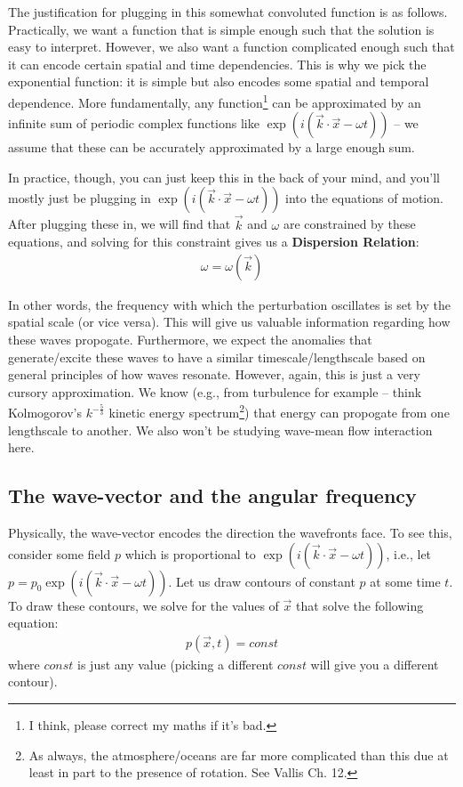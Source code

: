 The justification for plugging in this somewhat convoluted function is as follows. Practically, we want a function that is simple enough such that the solution is easy to interpret. However, we also want a function complicated enough such that it can encode certain spatial and time dependencies. This is why we pick the exponential function: it is simple but also encodes some spatial and temporal dependence. More fundamentally, any function\footnote{I think, please correct my maths if it's bad.} can be approximated by an infinite sum of periodic complex functions like \(\exp(i(\vec{k}\cdot\vec{x}-\omega t))\) -- we assume that these can be accurately approximated by a large enough sum.

In practice, though, you can just keep this in the back of your mind, and you'll mostly just be plugging in \(\exp(i(\vec{k}\cdot\vec{x}-\omega t))\) into the equations of motion. After plugging these in, we will find that \(\vec{k}\) and \(\omega\) are constrained by these equations, and solving for this constraint gives us a \textbf{Dispersion Relation}:
\begin{align*}
    \omega=\omega(\vec{k})
\end{align*} 

In other words, the frequency with which the perturbation oscillates is set by the spatial scale (or vice versa). This will give us valuable information regarding how these waves propogate. Furthermore, we expect the anomalies that generate/excite these waves to have a similar timescale/lengthscale based on general principles of how waves resonate. However, again, this is just a very cursory approximation. We know (e.g., from turbulence for example – think Kolmogorov's \(k^{-\frac{5}{3}}\) kinetic energy spectrum\footnote{As always, the atmosphere/oceans are far more complicated than this due at least in part to the presence of rotation. See Vallis \cite{Vallis} Ch. 12.}) that energy can propogate from one lengthscale to another. We also won't be studying wave-mean flow interaction here.

\subsection{The wave-vector and the angular frequency}

Physically, the wave-vector encodes the direction the wavefronts face. To see this, consider some field \(p\) which is proportional to \(\exp(i(\vec{k}\cdot\vec{x}-\omega t))\), i.e., let \(p = p_0 \exp(i(\vec{k}\cdot\vec{x}-\omega t))\). Let us draw contours of constant \(p\) at some time \(t\). To draw these contours, we solve for the values of \(\vec{x}\) that solve the following equation:
\begin{align*}
    p(\vec{x},t)=const
\end{align*}
where \(const\) is just any value (picking a different \(const\) will give you a different contour).


